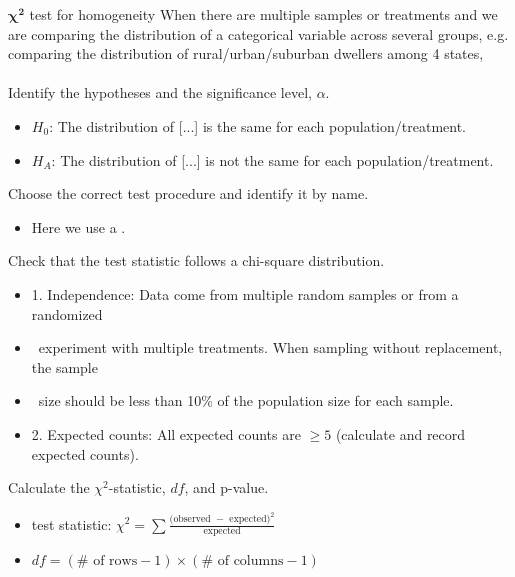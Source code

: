 \begin{onebox}{$\mathbf{\chi^2}$ test for homogeneity}
 When there are multiple samples or treatments and we are comparing the distribution
of a categorical variable across several groups, e.g. comparing the distribution of
rural/urban/suburban dwellers among 4 states, 
\\
\\
 Identify the hypotheses and the significance level, $\alpha$. \vspace{-1mm}
\begin{itemize}
\setlength{\itemsep}{0mm}
\item[] $H_0$: The distribution of [...] is the same for each population/treatment.  
\item[] $H_A$: The distribution of [...] is not the same for each population/treatment.   
\end{itemize}
 Choose the correct test procedure and identify it by name.\vspace{-1mm}
\begin{itemize}
\item[]  Here we use a .
\end{itemize}
 Check that the test statistic follows a chi-square distribution.\vspace{-1mm}
\begin{itemize}
\setlength{\itemsep}{0mm}
\item[] 1.  Independence:  Data come from multiple random samples or from a randomized 
\item[] \quad \ experiment with multiple treatments.  When sampling without replacement, the sample 
\item[] \ \quad size should be less than 10\% of the population size for each sample.
\item[] 2.   Expected counts:  All expected counts are $\ge 5$ (calculate and record expected counts).
\end{itemize}
 Calculate the $\chi^2$-statistic, $df$, and p-value.\vspace{-1mm}  
\begin{itemize}
\setlength{\itemsep}{0mm}
\item[] test statistic:  $\chi^2 =\sum{ \frac{\text{(observed } - \text{ expected})^2}{\text{expected}}}$ 
\item[] $df = (\# \text{ of rows} - 1) \times (\# \text{ of columns} - 1)$

\end{itemize}
\end{onebox}
